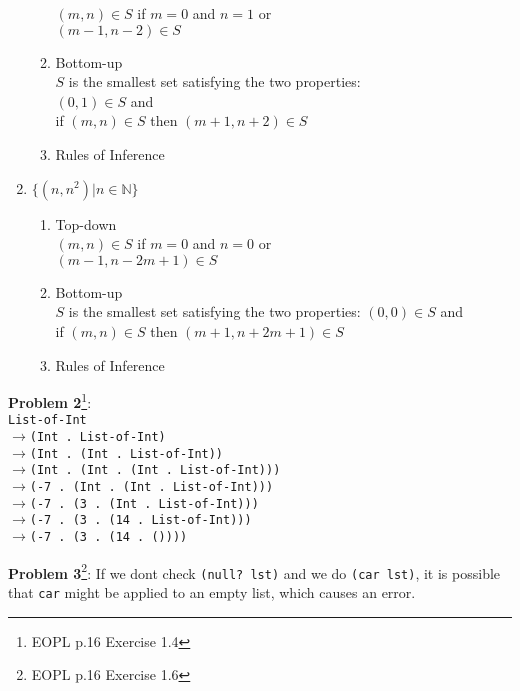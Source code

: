 \documentclass[12pt,reqno]{amsart}
\newcommand{\code}[1]{\texttt{#1}}
\begin{document}
\begin{enumerate}
\begin{enumerate}
	$(m, n) \in S$ if $m=0$ and $n=1$ or \\
	$(m-1, n-2) \in S$
	\item Bottom-up\\
	$S$ is the smallest set satisfying the two properties: \\$(0, 1) \in S$ and \\ 
	if $(m, n) \in S$ then $(m+1, n+2) \in S$
	\item Rules of Inference\\
	 \hspace{2mm} 
	\end{enumerate}
	\item $\{(n, n^2) | n \in \mathbb{N} \}$
	\begin{enumerate} \item Top-down\\
	$(m, n) \in S$ if $m=0$ and $n=0$ or \\
	$(m-1, n-2m+1) \in S$
	\item Bottom-up\\
	$S$ is the smallest set satisfying the two properties: $(0, 0) \in S$ and \\ 
	if $(m, n) \in S$ then $(m+1, n+2m+1) \in S$
	\item Rules of Inference\\
	 \hspace{2mm} 
	\end{enumerate}
	
\end{enumerate}

\vspace{7.5mm}
\textbf{Problem 2}\footnote{EOPL p.16 Exercise 1.4}: \\
\code{List-of-Int} \\
$\xrightarrow{}$\code{(Int . List-of-Int)} \\
$\xrightarrow{}$\code{(Int . (Int . List-of-Int))} \\
$\xrightarrow{}$\code{(Int . (Int . (Int . List-of-Int)))} \\
$\xrightarrow{}$\code{(-7 . (Int . (Int . List-of-Int)))} \\
$\xrightarrow{}$\code{(-7 . (3 . (Int . List-of-Int)))} \\
$\xrightarrow{}$\code{(-7 . (3 . (14 . List-of-Int)))} \\
$\xrightarrow{}$\code{(-7 . (3 . (14 . ())))} 

\vspace{7.5mm}
\textbf{Problem 3}\footnote{EOPL p.16 Exercise 1.6}: 
If we dont check \code{(null? lst)} and we do \code{(car lst)}, it is possible that \code{car} might be applied to an empty list, which causes an error.
\end{document}
